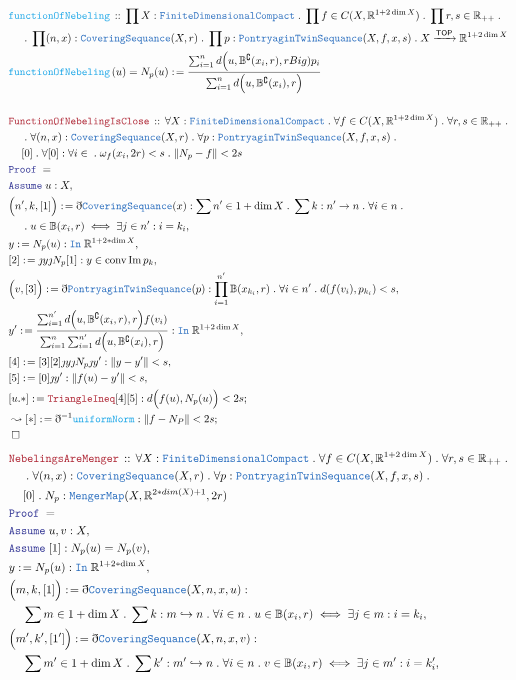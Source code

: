 \documentclass[12pt]{scrartcl}
\newcommand{\TYPE}[1]{\textcolor{NavyBlue}{\mathtt{#1}}}
\newcommand{\FUNC}[1]{\textcolor{Cerulean}{\mathtt{#1}}}
\newcommand{\LOGIC}[1]{\textcolor{Blue}{\mathtt{#1}}}
\newcommand{\THM}[1]{\textcolor{Maroon}{\mathtt{#1}}}
\renewcommand{\.}{\; . \;}
\newcommand{\de}{: \kern 0.1pc =}
\newcommand{\Act}[1]{\left( #1 \right)}
\newcommand{\Theorem}[2]{& \THM{#1} \, :: \, #2 \\ & \Proof = \\ }
\newcommand{\DeclareFunc}[2]{& \FUNC{#1} \, :: \, #2 \\}
\newcommand{\DefineNamedFunc}[4]{&  \FUNC{#1}\Act{#2} = #3 \de #4 \\}
\newcommand{\NewLine}{\\ & \kern 1pc}
\newcommand{\Page}[1]{ \begin{align*} #1 \end{align*}   }
\newcommand{ \bd }{ \ByDef }
\newcommand{\Reals}{\mathbb{R} }
\DeclareMathOperator*{\im}{Im}
\newcommand{\ToInj}{\hookrightarrow}
\newcommand{\Arrow}{\xrightarrow}
\renewcommand{\c}{\complement}
\newcommand{\Say}[3]{& #1 \de #2 : #3, \\}
\newcommand{\Conclude}[3]{& #1 \de #2 : #3; \\}
\newcommand{\DeriveConclude}[3]{& \leadsto #1 \de #2 : #3 ; \\}
\newcommand{\Assume}[2]{& \LOGIC{Assume} \; #1 : #2, \\}
\newcommand{\QED}{\; \square}
\newcommand{\EndProof}{& \QED \\}
\newcommand{\ByDef}{\eth}
\newcommand{\ByConstr}{\jmath}
\newcommand{\Proof}{\LOGIC{Proof} \; }
\newcommand{\TOP}{\mathsf{TOP}}
\begin{document}
\Page{
	\DeclareFunc{functionOfNebeling}
	{
		\prod X : \TYPE{FiniteDimensionalCompact}  \.
		\prod f \in  C(X,\Reals^{1 + 2\dim X}) \.
		\prod r,s \in \Reals_{++} \. \NewLine \.
		\prod (n,x) : \TYPE{CoveringSequance}(X,r) \.
		\prod p : \TYPE{PontryaginTwinSequance}(X,f,x,s) \.
		X \Arrow{\TOP} \Reals^{1 + 2 \dim X}
	}
	\DefineNamedFunc{functionOfNebeling}{u}{N_p(u)}{ \frac{\sum^n_{i=1} d\Big(u, \mathbb{B}^\c(x_i,r), rBig)p_i}{ \sum^n_{i=1} d\Big(u, \mathbb{B}^\c(x_i), r \Big) }   }
	\\
	\Theorem{FunctionOfNebelingIsClose}
	{
		\forall X : \TYPE{FiniteDimensionalCompact}  \.
		\forall f \in  C(X,\Reals^{1 + 2\dim X}) \.
		\forall r,s \in \Reals_{++} \. \NewLine \.
		\forall (n,x) : \TYPE{CoveringSequance}(X,r) \.
		\forall p : \TYPE{PontryaginTwinSequance}(X,f,x,s) \.\NewLine [0] \.
		\forall [0] : \forall i \in \.  \omega_f(x_i,2r) < s \.
		\| N_p -  f  \|  < 2s
	}
	\Assume{u}{X}
	\Say{\Big(n',k,[1]\Big)}{\bd \TYPE{CoveringSequance}(x)}
	{
		\sum n' \in 1 + \dim X \. 
		\sum k : n' \to n \.  
		\forall i \in n \. \NewLine \.
		u \in \mathbb{B}(x_i,r) \iff 
		\exists j \in n' : i = k_i
	}
	\Say{y}{N_p(u)}{\TYPE{In} \; \Reals^{1 + 2*\dim X}}
	\Say{[2]}{\ByConstr y \ByConstr N_p [1] }{y \in  \mathrm{conv} \im p_k}
	\Say{\Big(v,[3] \Big)}{\bd \TYPE{PontryaginTwinSequance}(p)}{\prod^{n'}_{i=1} \mathbb{B}(x_{k_i},r) \. \forall i \in n' \. d(f(v_i),p_{k_i}) < s}
	\Say{y'}{ \frac{\sum^{n'}_{i=1} d\Big(u, \mathbb{B}^\c(x_i,r), r\Big)f(v_i)}{\sum^n_{i=1} \sum^{n'}_{i=1} d\Big(u, \mathbb{B}^\c(x_i), r \Big) }}{\TYPE{In} \; \Reals^{1 + 2\dim X}}	
	\Say{[4]}{ [3][2]\ByConstr y \ByConstr N_p \ByConstr y'}{ \| y - y'\| < s}
	\Say{[5]}{[0] \ByConstr y'}{\|f(u) - y'\|<s}
	\Conclude{[u.*]}{\THM{TriangleIneq}[4][5] }{d\Big( f(u), N_p(u) \Big) < 2s}
	\DeriveConclude{[*]}{\bd^{-1} \FUNC{uniformNorm}}{ \| f - N_P \| < 2s}
	\EndProof
}\Page{
	\Theorem{NebelingsAreMenger}
	{
		\forall X : \TYPE{FiniteDimensionalCompact}  \.
		\forall f \in  C(X,\Reals^{1 + 2\dim X}) \.
		\forall r,s \in \Reals_{++} \. \NewLine \.
		\forall (n,x) : \TYPE{CoveringSequance}(X,r) \.
		\forall p : \TYPE{PontryaginTwinSequance}(X,f,x,s) \.\NewLine [0] \.
		N_p : \TYPE{MengerMap}(X,\Reals^{2*dim(X) + 1},2r)
	}
	\Assume{u,v}{X}
	\Assume{[1]}{N_p(u) = N_p(v)}
	\Say{y}{N_p(u)}{\TYPE{In} \; \Reals^{1 + 2*\dim X}}
	\Say{\Big(m,k,[1]\Big)}{\bd \TYPE{CoveringSequance}(X,n,x,u)}{\NewLine \sum m \in 1 + \dim X \. \sum k : m \ToInj n \. \forall i \in n \. u \in \mathbb{B}(x_i,r) \iff \exists j \in m : i = k_i }
	\Say{\Big(m',k',[1']\Big)}{\bd \TYPE{CoveringSequance}(X,n,x,v)}{\NewLine \sum m' \in 1 + \dim X \. \sum k' : m' \ToInj n \. \forall i \in n \. v \in \mathbb{B}(x_i,r) \iff \exists j \in m' : i = k'_i }
}
\end{document}
